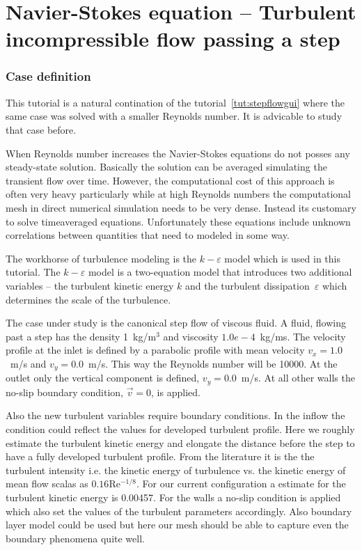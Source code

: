 \chapter{Navier-Stokes equation -- Turbulent incompressible flow passing a step}
\label{tut:stepflowke}




\subsection*{Case definition}

This tutorial is a natural contination of the tutorial~\ref{tut:stepflowgui}
where the same case was solved with a smaller Reynolds number. It is advicable 
to study that case before. 

When Reynolds number increases the 
Navier-Stokes equations do not posses any steady-state 
solution. Basically the solution can be averaged simulating the transient 
flow over time. However, the computational cost of this approach is often very 
heavy particularly while at high Reynolds numbers the computational mesh
in direct numerical simulation needs to be very dense. Instead its customary
to solve timeaveraged equations. Unfortunately these equations include 
unknown correlations between quantities that need to modeled in some way.

The workhorse of turbulence modeling is the $k-\varepsilon$ model which 
is used in this tutorial. The $k-\varepsilon$ model is a two-equation model
that introduces two additional variables -- the turbulent kinetic energy $k$ and the 
turbulent dissipation~$\varepsilon$
which determines the scale of the turbulence.

The case under study is the canonical step flow of viscous fluid. 
A fluid, flowing past a step has the density
1~kg/m$^3$ and viscosity $1.0e-4$~kg/ms. The velocity profile at the inlet is
defined by a parabolic profile with mean velocity 
$v_x=1.0$~m/s and $v_y=0.0$~m/s. 
This way the Reynolds number will be 10000.
At the outlet only 
the vertical component is defined, $v_y=0.0$~m/s. At all other
walls the no-slip boundary condition, $\vec{v}=0$, is applied. 

Also the new turbulent variables require boundary conditions. 
In the inflow the condition could reflect the values for developed turbulent
profile. Here we roughly estimate the turbulent kinetic energy and 
elongate the distance before the step 
to have a fully developed turbulent profile. 
From the literature it is the the turbulent intensity i.e. the 
kinetic energy of turbulence vs. the kinetic energy of mean flow 
scalas as $0.16$Re$^{-1/8}$. For our current configuration a estimate for the 
turbulent kinetic energy is 0.00457. 
For the walls a no-slip condition is applied which also set the values of the
turbulent parameters accordingly. Also boundary layer model could be used but here
our mesh should be able to capture even the boundary phenomena quite well. 

